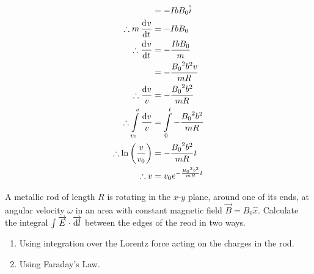 \documentclass[fleqn, a4paper, 12pt, twoside]{article}
\theoremstyle{definition}
\theoremstyle{theorem}
\begin{document}
\begin{solution}
\begin{align*}
                                                                          & = -I b B_0 \hat{i}                             \\
			\therefore m \dod{v}{t}                           & = -I b B_0                                     \\
			\therefore \dod{v}{t}                             & = -\frac{I b B_0}{m}                           \\
                                                                          & = -\frac{{B_0}^2 b^2 v}{m R}                   \\
			\therefore \frac{\dif v}{v}                       & = -\frac{{B_0}^2 b^2}{m R}                     \\
			\therefore \int\limits_{v_0}^{v} \frac{\dif v}{v} & = \int\limits_{0}^{t} -\frac{{B_0}^2 b^2}{m R} \\
			\therefore \ln\left( \frac{v}{v_0} \right)        & = -\frac{{B_0}^2 b^2}{m R} t                   \\
			\therefore v                                      & = v_0 e^{-\frac{{B_0}^2 b^2}{m R} t}
		\end{align*}
\end{solution}

\begin{question}
	A metallic rod of length $R$ is rotating in the $x$-$y$ plane, around one of its ends, at angular velocity $\omega$ in an area with constant magnetic field $\overrightarrow{B} = B_0 \hat{x}$.
	Calculate the integral $\int \overrightarrow{E} \cdot \overrightarrow{\dif l}$ between the edges of the reod in two ways.
	\begin{enumerate}
		\item Using integration over the Lorentz force acting on the charges in the rod.
		\item Using Faraday's Law.
	\end{enumerate}
\end{question}
\end{document}
